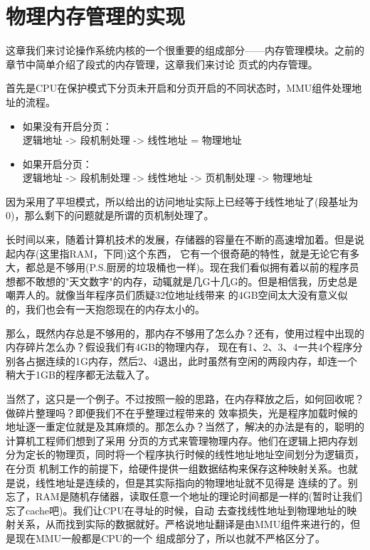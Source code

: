 
\section {物理内存管理的实现}

\par 这章我们来讨论操作系统内核的一个很重要的组成部分——内存管理模块。之前的章节中简单介绍了段式的内存管理，这章我们来讨论\allowbreak
页式的内存管理。

\par 首先是CPU在保护模式下分页未开启和分页开启的不同状态时，MMU组件处理地址的流程。

\begin{mdframed}
	\begin{itemize}
		\item 如果没有开启分页：\\ 逻辑地址 -> 段机制处理 -> 线性地址 = 物理地址
		\item 如果开启分页：\\ 逻辑地址 -> 段机制处理 -> 线性地址 -> 页机制处理 -> 物理地址
	\end{itemize}
\end{mdframed}

\par 因为采用了平坦模式，所以给出的访问地址实际上已经等于线性地址了(段基址为0)，那么剩下的问题就是所谓的页机制处理了。

\par 长时间以来，随着计算机技术的发展，存储器的容量在不断的高速增加着。但是说起内存(这里指RAM，下同)这个东西，\allowbreak
它有一个很奇葩的特性，就是无论它有多大，都总是不够用(P.S.厨房的垃圾桶也一样)。现在我们看似拥有着以前的程序员\allowbreak
想都不敢想的"天文数字"的内存，动辄就是几G十几G的。但是相信我，历史总是嘲弄人的。就像当年程序员们质疑32位地址线带来\allowbreak
的4GB空间太大没有意义似的，我们也会有一天抱怨现在的内存太小的。

\par 那么，既然内存总是不够用的，那内存不够用了怎么办？还有，使用过程中出现的内存碎片怎么办？假设我们有4GB的物理内存，\allowbreak
现在有1、2、3、4一共4个程序分别各占据连续的1G内存，然后2、4退出，此时虽然有空闲的两段内存，却连一个稍大于1GB的程序都无法载入了。

\par 当然了，这只是一个例子。不过按照一般的思路，在内存释放之后，如何回收呢？做碎片整理吗？即便我们不在乎整理过程带来的\allowbreak
效率损失，光是程序加载时候的地址逐一重定位就是及其麻烦的。那怎么办？当然了，解决的办法是有的，聪明的计算机工程师们想到了采用\allowbreak
分页的方式来管理物理内存。他们在逻辑上把内存划分为定长的物理页，同时将一个程序执行时候的线性地址地址空间划分为逻辑页，在分页\allowbreak
机制工作的前提下，给硬件提供一组数据结构来保存这种映射关系。也就是说，线性地址是连续的，但是其实际指向的物理地址就不见得是\allowbreak
连续的了。别忘了，RAM是随机存储器，读取任意一个地址的理论时间都是一样的(暂时让我们忘了cache吧)。我们让CPU在寻址的时候，自动\allowbreak
去查找线性地址到物理地址的映射关系，从而找到实际的数据就好。严格说地址翻译是由MMU组件来进行的，但是现在MMU一般都是CPU的一个\allowbreak
组成部分了，所以也就不严格区分了。

